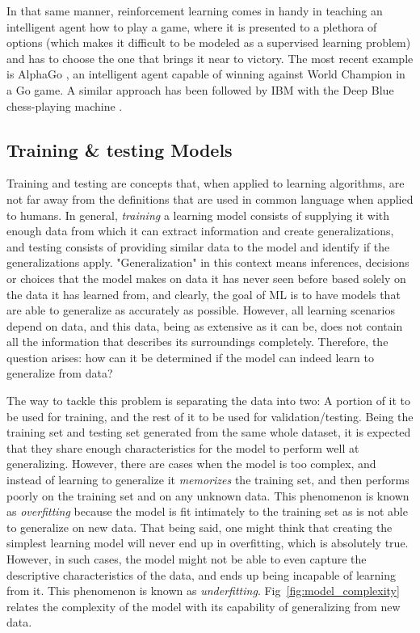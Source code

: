 In that same manner, reinforcement learning comes in handy in teaching an intelligent agent how to play a game, where it is presented to a plethora of options (which makes it difficult to be modeled as a supervised learning problem) and has to choose the one that brings it near to victory. The most recent example is AlphaGo \cite{Fu2017}, an intelligent agent capable of winning against World Champion in a Go game. A similar approach has been followed by IBM with the Deep Blue chess-playing machine \cite{Hsu1999}.

\subsection{Training \& testing Models}
Training and testing are concepts that, when applied to learning algorithms, are not far away from the definitions that are used in common language when applied to humans. In general, \emph{training} a learning model consists of supplying it with enough data from which it can extract information and create generalizations, and testing consists of providing similar data to the model and identify if the generalizations apply. "Generalization" in this context means inferences, decisions or choices that the model makes on data it has never seen before based solely on the data it has learned from, and clearly, the goal of \ac{ML} is to have models that are able to generalize as accurately as possible. However, all learning scenarios depend on data, and this data, being as extensive as it can be, does not contain all the information that describes its surroundings completely. Therefore, the question arises: how can it be determined if the model can indeed learn to generalize from data?

The way to tackle this problem is separating the data into two: A portion of it to be used for training, and the rest of it to be used for validation/testing. Being the training set and testing set generated from the same whole dataset, it is expected that they share enough characteristics for the model to perform well at generalizing. However, there are cases when the model is too complex, and instead of learning to generalize it \emph{memorizes} the training set, and then performs poorly on the training set and on any unknown data. This phenomenon is known as \emph{overfitting} because the model is fit intimately to the training set as is not able to generalize on new data. That being said, one might think that creating the simplest learning model will never end up in overfitting, which is absolutely true. However, in such cases, the model might not be able to even capture the descriptive characteristics of the data, and ends up being incapable of learning from it. This phenomenon is known as \emph{underfitting}. Fig~\ref{fig:model_complexity} relates the complexity of the model with its capability of generalizing from new data.

